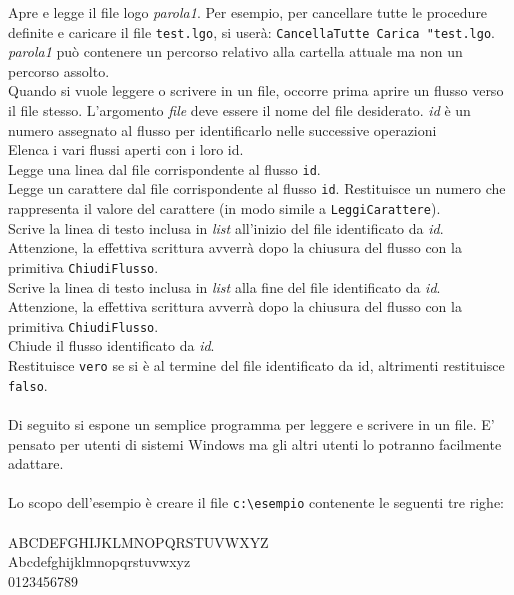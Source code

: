 Apre e legge il file logo \textit{parola1}. Per esempio, per cancellare tutte le procedure definite e caricare il file  \texttt{test.lgo}, si userà: \texttt{CancellaTutte Carica "test.lgo}. \textit{parola1} può contenere un percorso relativo alla cartella attuale ma non un percorso assolto.\\

Quando si vuole leggere o scrivere in un file, occorre prima aprire un flusso verso il file stesso. L'argomento \textit{file} deve essere il nome del file desiderato. \textit{id} è un numero assegnato al flusso per identificarlo nelle successive operazioni\\

Elenca i vari flussi aperti con i loro id.\\

Legge una linea dal file corrispondente al flusso \texttt{id}. \\

Legge un carattere dal file corrispondente al flusso \texttt{id}. Restituisce un numero che rappresenta il valore del carattere (in modo simile a \texttt{LeggiCarattere}).\\

Scrive la linea di testo inclusa in \textit{list} all'inizio del file identificato da \textit{id}. Attenzione, la effettiva scrittura avverrà dopo la chiusura del flusso con la primitiva \texttt{ChiudiFlusso}.\\

Scrive la linea di testo inclusa in \textit{list} alla fine del file identificato da \textit{id}. Attenzione, la effettiva scrittura avverrà dopo la chiusura del flusso con la primitiva \texttt{ChiudiFlusso}.\\

Chiude il flusso identificato da \textit{id}. \\

Restituisce \texttt{vero} se si è al termine del file identificato da id, altrimenti restituisce \texttt{falso}. \\ \\

Di seguito si espone un semplice programma per leggere e scrivere in un file. E' pensato per utenti di sistemi Windows ma gli altri utenti lo potranno facilmente adattare.\\ \\
\noindent
Lo scopo dell'esempio è creare il file \texttt{c:\textbackslash esempio} contenente le seguenti tre righe:\\ \\
ABCDEFGHIJKLMNOPQRSTUVWXYZ  \\
Abcdefghijklmnopqrstuvwxyz  \\
0123456789 \\

